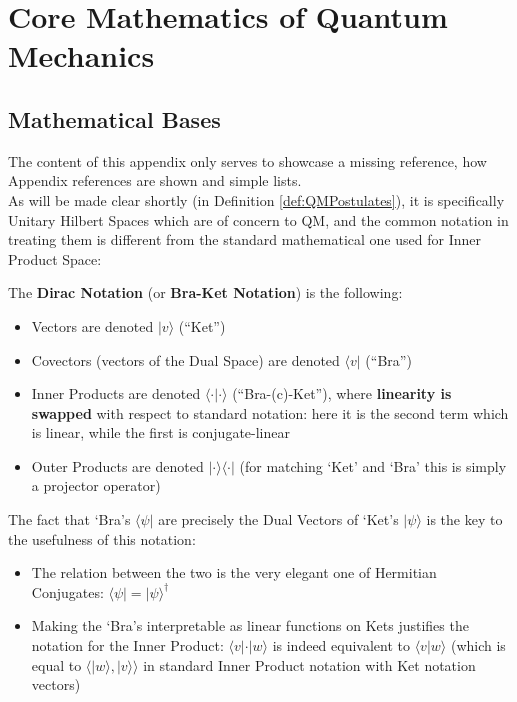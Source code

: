 \section{Core Mathematics of Quantum Mechanics}
\label{sec:CoreMathsOfQM}



\subsection{Mathematical Bases}
\label{sec:SubMathBases}

The content of this appendix only serves to showcase a missing reference, how Appendix references are shown and simple lists.\\

As will be made clear shortly (in Definition \ref{def:QMPostulates}), it is specifically \gls{Unitary} Hilbert Spaces which are of concern to \gls{QM},
and the common notation in treating them is different from the standard mathematical one used for Inner Product Space:

\begin{defn}\label{def:DiracNotation}
    The \textbf{Dirac Notation} (or \textbf{Bra-Ket Notation}) is the following:
    \begin{itemize}[noitemsep]
        \item Vectors are denoted $|v\rangle$ (``Ket'')
        \item Covectors (vectors of the \gls{Dual Space}) are denoted $\langle v|$ (``Bra'')
        \item Inner Products are denoted $\langle\cdot|\cdot\rangle$ (``Bra-(c)-Ket''), where \textbf{linearity is swapped} with respect to standard notation:
            here it is the second term which is linear, while the first is conjugate-linear
        \item Outer Products are denoted $|\cdot\rangle\langle\cdot|$ (for matching `Ket' and `Bra' this is simply a projector operator)
    \end{itemize}
    The fact that `Bra's $\langle\psi|$ are precisely the Dual Vectors of `Ket's $|\psi\rangle$ is the key to the usefulness of this notation:
    \begin{itemize}[noitemsep]
        \item The relation between the two is the very elegant one of \glspl{Hermitian Conjugate}: $\langle\psi| = |\psi\rangle^{\dagger}$
        \item Making the `Bra's interpretable as linear functions on Kets justifies the notation for the Inner Product: $\langle v| \cdot |w\rangle$ is indeed
            equivalent to $\langle v|w \rangle$ (which is equal to $\langle |w\rangle,|v\rangle \rangle$ in standard Inner Product notation with Ket notation vectors)
    \end{itemize}
\end{defn}


